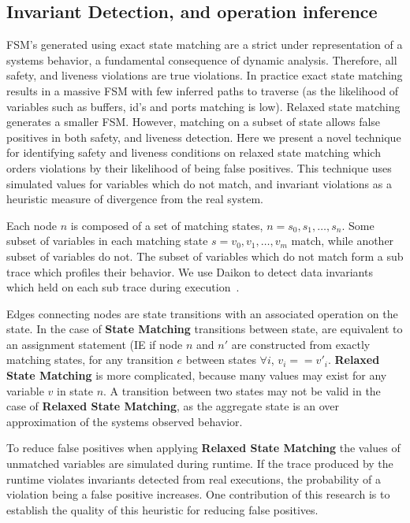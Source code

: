 
\subsection{Invariant Detection, and operation inference}

FSM's generated using exact state matching are a strict under representation of
a systems behavior, a fundamental consequence of dynamic analysis. Therefore,
all safety, and liveness violations are true violations. In practice exact state
matching results in a massive FSM with few inferred paths to traverse (as the
likelihood of variables such as buffers, id's and ports matching is low).
Relaxed state matching generates a smaller FSM. However, matching on a subset
of state allows false positives in both safety, and liveness detection. Here we
present a novel technique for identifying safety and liveness conditions on
relaxed state matching which orders violations by their likelihood of being
false positives.  This technique uses simulated values for variables which do
not match, and invariant violations as a heuristic measure of divergence from
the real system.

Each node $n$ is composed of a set of matching states, $n =
{s_0,s_1,\dots,s_n}$. Some subset of variables in each matching state $s =
{v_0,v_1,\dots,v_m}$ match, while another subset of variables do not. The
subset of variables which do not match form a sub trace which profiles their
behavior. We use Daikon to detect data invariants which held on each sub trace
during execution~\cite{Ernst07}.

Edges connecting nodes are state transitions with an associated operation on
the state. In the case of \textbf{State Matching} transitions between state,
are equivalent to an assignment statement (IE if node $n$ and $n'$ are
constructed from exactly matching states, for any transition $e$ between states
$\forall i$, $v_i == v'_i$. \textbf{Relaxed State Matching} is more
complicated, because many values may exist for any variable $v$ in state $n$. A
transition between two states may not be valid in the case of \textbf{Relaxed
State Matching}, as the aggregate state is an over approximation of the systems
observed behavior.

To reduce false positives when applying \textbf{Relaxed State Matching} the
values of unmatched variables are simulated during runtime. If the trace
produced by the runtime violates invariants detected from real executions, the
probability of a violation being a false positive increases. One contribution
of this research is to establish the quality of this heuristic for reducing
false positives.

